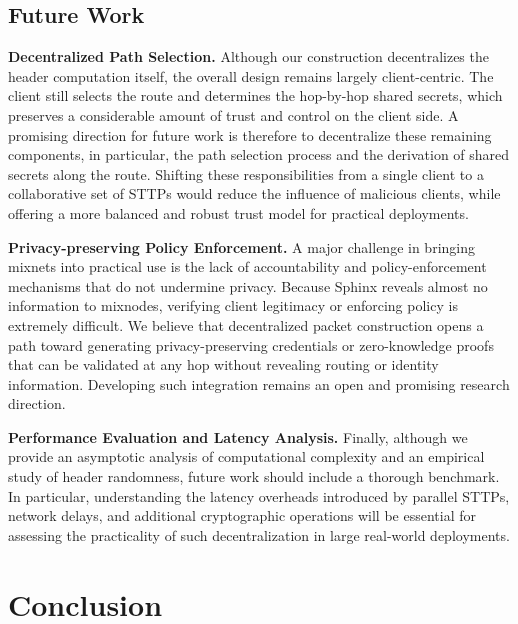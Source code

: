 \subsection{Future Work}

\noindent\textbf{Decentralized Path Selection.} 
Although our construction decentralizes the header computation itself, the overall design remains largely client-centric. 
The client still selects the route and determines the hop-by-hop shared secrets, which preserves a considerable amount of trust and control on the client side. 
A promising direction for future work is therefore to decentralize these remaining components, in particular, the path selection process and the derivation of shared secrets along the route. 
Shifting these responsibilities from a single client to a collaborative set of STTPs would reduce the influence of malicious clients, while offering a more balanced and robust trust model for practical deployments.

\noindent\textbf{Privacy-preserving Policy Enforcement.} 
A major challenge in bringing mixnets into practical use is the lack of accountability and policy-enforcement mechanisms that do not undermine privacy.
Because Sphinx reveals almost no information to mixnodes, verifying client legitimacy or enforcing policy is extremely difficult.  
We believe that decentralized packet construction opens a path toward generating privacy-preserving credentials or zero-knowledge proofs that can be validated at any hop without revealing routing or identity information.  
Developing such integration remains an open and promising research direction.

\noindent\textbf{Performance Evaluation and Latency Analysis.} 
Finally, although we provide an asymptotic analysis of computational complexity and an empirical study of header randomness, future work should include a thorough benchmark.  
In particular, understanding the latency overheads introduced by parallel STTPs, network delays, and additional cryptographic operations will be essential for assessing the practicality of such decentralization in large real-world deployments.  



\section{Conclusion}\label{sec:conclusion}

